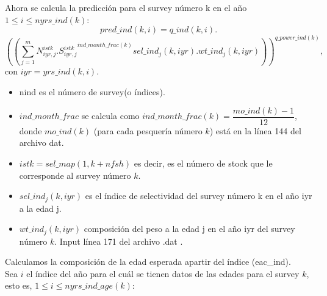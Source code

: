 \documentclass{article}
\begin{document}
Ahora se calcula la predicción para el survey número k en el año $1\leq i \leq nyrs\_ind(k)$:
\begin{equation}
    pred\_ind(k,i)=q\_ind(k,i).
\end{equation}
\begin{equation}
    \left(\left(\sum_{j=1}^mN^{istk}_{iyr,j}.{S^{istk}_{iyr,j}}^{ind\_month\_frac(k)}sel\_ind_j(k,iyr).wt\_ind_j(k,iyr)\right)\right)^{q\_power\_ind(k)},
\end{equation}
con $iyr=yrs\_ind(k,i)$.
\begin{itemize}
\item nind es el número de survey(o índices).

    \item $ind\_month\_frac$ se calcula como $ind\_month\_frac(k)=\dfrac{mo\_ind(k)-1}{12}$, donde $mo\_ind(k)$ (para cada pesquería número $k$) está en la línea 144 del archivo dat.
    \item $istk=sel\_map(1,k+nfsh)$ es decir, es el número de stock que le corresponde al survey número $k$.
    \item $sel\_ind_j(k,iyr)$ es el índice de selectividad del survey número k en el año iyr a la edad j.
    \item $wt\_ind_j(k,iyr)$ composición del peso a la edad j en el año iyr del survey número $k$. Input línea 171 del archivo .dat .
    \end{itemize}
Calculamos la composición de la edad esperada apartir del índice (eac\_ind).\\
Sea $i$ el índice del año para el cuál se tienen datos de las edades para el survey $k$, esto es, $1\leq i \leq nyrs\_ind\_age(k)$:
\end{document}
